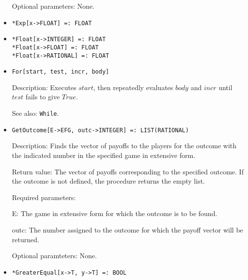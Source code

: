 \begin{itemize}
\item
[Optional parameters:] None.

\ed

\item
\protect \large \begin{verbatim}
*Exp[x->FLOAT] =: FLOAT
\end{verbatim} \normalsize



\item
\protect \large \begin{verbatim}
*Float[x->INTEGER] =: FLOAT
*Float[x->FLOAT] =: FLOAT
*Float[x->RATIONAL] =: FLOAT
\end{verbatim} \normalsize


\item
\protect \large \begin{verbatim}
For[start, test, incr, body]
\end{verbatim}\normalsize

\bd
\item
[Description:] Executes $start$, then repeatedly evaluates $body$ and $incr$
until $test$ fails to give $True$.
\item
[See also:] \verb+While+.
\ed


\item
\protect \large \begin{verbatim}
GetOutcome[E->EFG, outc->INTEGER] =: LIST(RATIONAL)
\end{verbatim}\normalsize

\bd
\item
[Description:] Finds the vector of payoffs to the players for the
outcome with the indicated number in the specified game in
extensive form.
\item
[Return value:] The vector of payoffs corresponding to the specified
outcome.  If the outcome is not defined, the procedure returns the
empty list.
\item
[Required parameters:]\hfil\null

\bd
\item
[E:] The game in extensive form for which the outcome is to be
found.
\item
[outc:] The number assigned to the outcome for which the payoff vector
will be returned.
\ed

\item
[Optional paramteters:] None.
\ed

\item
\protect \large \begin{verbatim}
*GreaterEqual[x->T, y->T] =: BOOL
\end{verbatim}\normalsize


\end{itemize}
